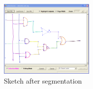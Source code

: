 \documentclass{acmsiggraph}               %
\begin{document}
\begin{figure}[p]
\centering
\includegraphics[width=1.8in]{segmentedSketch.png}
\caption{Sketch after segmentation}
\label{segmented}
\end{figure}



\nocite{*}

\end{document}
